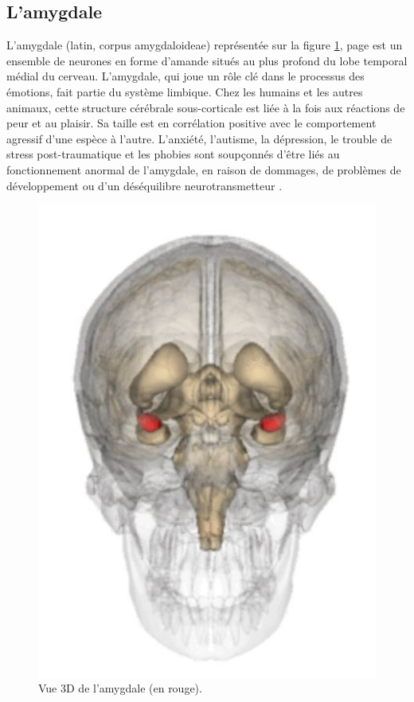 
\subsection{ L'amygdale}

L'amygdale (latin, corpus amygdaloideae) représentée sur la figure \ref{fig:amy}, page \pageref{fig:amy}
est un ensemble de neurones en forme d'amande situés au plus profond du lobe temporal médial du cerveau.
L'amygdale, qui joue un rôle clé dans le processus des émotions, fait partie du système limbique.
Chez les humains et les autres animaux, cette structure cérébrale sous-corticale est liée à la fois aux réactions de peur et au plaisir.
Sa taille est en corrélation positive avec le comportement agressif d'une espèce à l'autre.
L'anxiété, l'autisme, la dépression, le trouble de stress post-traumatique et les phobies sont soupçonnés d'être liés au fonctionnement anormal de l'amygdale, en raison de dommages, de problèmes de développement ou d'un déséquilibre neurotransmetteur \parencite{amygdale}.

\begin{figure}[th]
\centering
\includegraphics{Figures/2}
\decoRule
\caption[L'amygdale]{Vue 3D de l'amygdale (en rouge).}
\label{fig:amy}
\end{figure}


